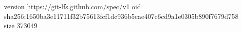 version https://git-lfs.github.com/spec/v1
oid sha256:1650ba3e11711f32b75613fcf1dc936b5cae407c6cd9a1e0305b890f7679d758
size 373049
